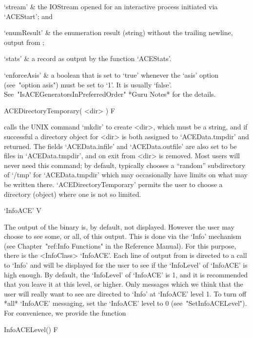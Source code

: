 \quad`stream' & the IOStream opened for an interactive {\ACE}  process
initiated via `ACEStart'; and

\quad`enumResult' & 
the enumeration result (string) without the trailing  newline,  output
from {\ACE};

\quad`stats'  & a record as output by the function `ACEStats'.

\quad`enforceAsis' & 
a  boolean  that  is  set  to  `true'  whenever  the   `asis'   option
(see~"option asis") must  be  set  to  `1'.  It  is  usually  `false'.
See~"IsACEGeneratorsInPreferredOrder" *Guru Notes* for the details.

\enditems

\>ACEDirectoryTemporary( <dir> ) F

calls the UNIX command `mkdir'  to  create  <dir>,  which  must  be  a
string, and if  successful  a  directory  object  for  <dir>  is  both
assigned to `ACEData.tmpdir' and returned. The fields `ACEData.infile'
and `ACEData.outfile' are also set to be  files  in  `ACEData.tmpdir',
and on exit from {\GAP} <dir> is removed. Most users will  never  need
this command;  by  default,  {\GAP}  typically  chooses  a  ``random''
subdirectory of `/tmp' for  `ACEData.tmpdir'  which  may  occasionally
have limits on what  may  be  written  there.  `ACEDirectoryTemporary'
permits the user to choose a directory (object) where one  is  not  so
limited.



\>`InfoACE' V

The output of the {\ACE} binary is, by default, not displayed. However
the user may choose to see some, or all, of this output. This is  done
via the `Info' mechanism  (see  Chapter~"ref:Info  Functions"  in  the
{\GAP} Reference Manual). For this purpose, there is  the  <InfoClass>
`InfoACE'. Each line of output from {\ACE} is directed to  a  call  to
`Info' and will be displayed for the user to see if the `InfoLevel' of
`InfoACE' is high enough. By default, the `InfoLevel' of `InfoACE'  is
1, and it is recommended that you leave it at this level,  or  higher.
Only messages which we think that the user will really want to see are
directed to `Info' at `InfoACE' level 1. To turn off  *all*  `InfoACE'
messaging, set the `InfoACE' level to 0  (see~"SetInfoACELevel").  For
convenience, we provide the function

\>InfoACELevel() F

